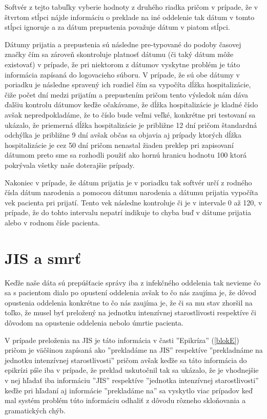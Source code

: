 Softvér z tejto tabuľky vyberie hodnoty z druhého riadka pričom v prípade, že v štvrtom stĺpci nájde informáciu o preklade na iné oddelenie tak dátum v tomto stĺpci ignoruje a za dátum prepustenia považuje dátum v piatom stĺpci.

Dátumy prijatia a prepustenia sú následne pre-typované do podoby časovej značky čím sa zároveň skontroluje platnosť dátumu (či taký dátum môže existovať) v prípade, že pri niektorom z dátumov vyskytne problém je táto informácia zapísaná do logovacieho súboru. V prípade, že sú obe dátumy v poriadku je následne spravený ich rozdiel čím sa vypočíta dĺžka hospitalizácie, čiže počet dní medzi prijatím a prepustením pričom tento výsledok nám dáva ďalšiu kontrolu dátumov keďže očakávame, že dĺžka hospitalizácie je kladné číslo avšak nepredpokladáme, že to číslo bude veľmi veľké, konkrétne pri testovaní sa ukázalo, že priemerná dĺžka hospitalizácie je približne 12 dní pričom štandardná odchýlka je približne 9 dní avšak občas sa objavia aj prípady ktorých dĺžka hospitalizácie je cez 50 dní pričom nenastal žiaden preklep pri zapisovaní dátumom preto sme sa rozhodli použiť ako hornú hranicu hodnotu 100 ktorá pokrývala všetky naše doterajšie prípady.

Nakoniec v prípade, že dátum prijatia je v poriadku tak softvér určí z rodného čísla dátum narodenia a pomocou dátumu narodenia a dátumu prijatia vypočíta vek pacienta pri prijatí. Tento vek následne kontroluje či je v intervale 0 až 120, v prípade, že do tohto intervalu nepatrí indikuje to chyba buď v dátume prijatia alebo v rodnom čísle pacienta.

\section{JIS a smrť}

Keďže naše dáta sú prepúšťacie správy iba z infekčného oddelenia tak nevieme čo sa s pacientom dialo po opustení oddelenia avšak to čo nás zaujíma je, že dôvod opustenia oddelenia konkrétne to čo nás zaujíma je, že či sa mu stav zhoršil na toľko, že musel byť preložený na jednotku intenzívnej starostlivosti respektíve či dôvodom na opustenie oddelenia nebolo úmrtie pacienta.

V prípade preloženia na JIS je táto informácia v časti ''Epikríza'' (\ref{blokE}) pričom je väčšinou zapísaná ako ''prekladáme na JIS'' respektíve ''prekladnáme na jednotku intenzívnej starostlivosti'' pričom avšak keďže sa táto informácia do epikrízi píše iba v prípade, že preklad uskutočnil tak sa ukázalo, že je vhodnejšie v nej hľadať iba informáciu ''JIS'' respektíve ''jednotka intenzívnej starostlivosti'' keďže pri hľadaní aj informácie ''prekladáme na'' sa vyskytlo viac prípadov keď mal systém problém túto informáciu odhaliť z dôvodu rôzneho skloňovania a gramatických chýb.


